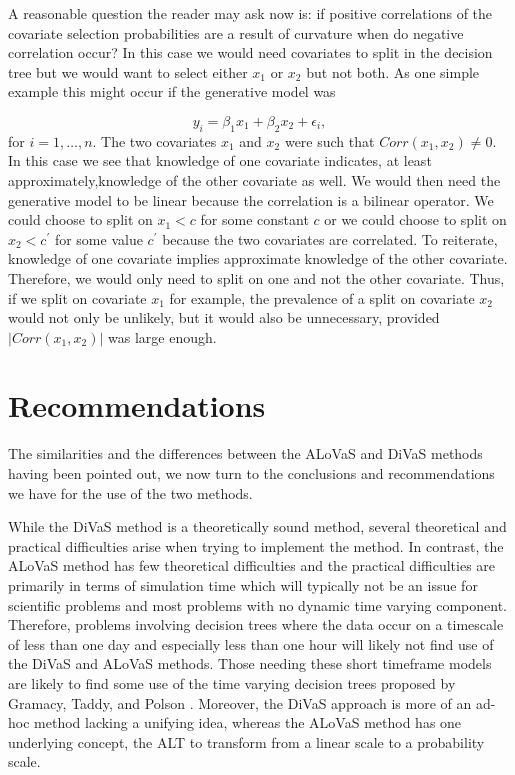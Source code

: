 A reasonable question the reader may ask now is: if positive correlations of the covariate selection probabilities are a result of curvature when do negative correlation occur? In this case we would need covariates to split in the decision tree but we would want to select either $x_1$ or $x_2$ but not both. As one simple example this might occur if the generative model was 

\begin{equation}
y_i = \beta_1x_1 + \beta_2x_2 + \epsilon_i,
\end{equation}
for $i=1, \dots, n$. The two covariates $x_1$ and $x_2$ were such that $Corr(x_1, x_2) \neq 0$. In this case we see that knowledge of one covariate indicates, at least approximately,knowledge of the other covariate as well. We would then need the generative model to be linear because the correlation is a bilinear operator. We could choose to split on $x_1<c$ for some constant $c$ or we could choose to split on $x_2 < c^\prime$ for some value $c^\prime$ because the two covariates are correlated. To reiterate, knowledge of one covariate implies approximate knowledge of the other covariate. Therefore, we would only need to split on one and not the other covariate. Thus, if we split on covariate $x_1$ for example, the prevalence of a split on covariate $x_2$ would not only be unlikely, but it would also be unnecessary, provided  $|Corr(x_1, x_2)|$ was large enough. 
 
\section{Recommendations}

The similarities and the differences between the ALoVaS and DiVaS methods having been pointed out, we now turn to the conclusions and recommendations we have for the use of the two methods. 

While the DiVaS method is a theoretically sound method, several theoretical and practical difficulties arise when trying to implement the method. In contrast, the ALoVaS method has few theoretical difficulties and the practical difficulties are primarily in terms of simulation time which will typically not be an issue for scientific problems and most problems with no dynamic time varying component. Therefore, problems involving decision trees where the data occur on a timescale of less than one day and especially less than one hour will likely not find use of the DiVaS and ALoVaS methods. Those needing these short timeframe models are likely to find some use of the time varying decision trees proposed by Gramacy, Taddy, and Polson \cite{taddy2011dynamic}. Moreover, the DiVaS approach is more of an ad-hoc method lacking a unifying idea, whereas the ALoVaS method has one underlying concept, the ALT to transform from a linear scale to a probability scale. 

